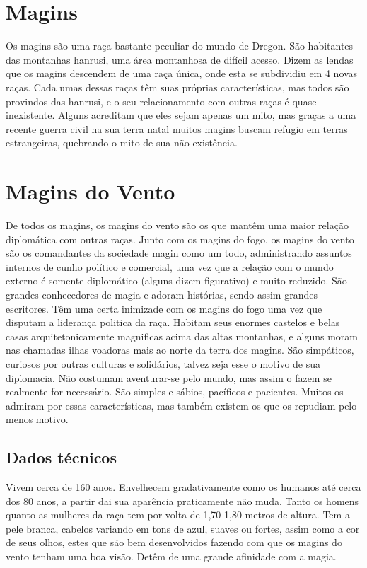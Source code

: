 \section{Magins}

Os magins são uma raça bastante peculiar do mundo de Dregon. São habitantes das montanhas hanrusi, uma área montanhosa de difícil acesso. Dizem as lendas que os magins descendem de uma raça única, onde esta se subdividiu em 4 novas raças. Cada umas dessas raças têm suas próprias características, mas todos são provindos das hanrusi, e o seu relacionamento com outras raças é quase inexistente. Alguns acreditam que eles sejam apenas um mito, mas graças a uma recente guerra civil na sua terra natal muitos magins buscam refugio em terras estrangeiras, quebrando o mito de sua não-existência.

\section{Magins do Vento}

De todos os magins, os magins do vento são os que mantêm uma maior relação diplomática com outras raças. Junto com os magins do fogo, os magins do vento são os comandantes da sociedade magin como um todo, administrando assuntos internos de cunho político e comercial, uma vez que a relação com o mundo externo é somente diplomático (alguns dizem figurativo) e muito reduzido. São grandes conhecedores de magia e adoram histórias, sendo assim grandes escritores. Têm uma certa inimizade com os magins do fogo uma vez que disputam a liderança politica da raça. Habitam seus enormes castelos e belas casas arquitetonicamente magnificas acima das altas montanhas, e alguns moram nas chamadas ilhas voadoras mais ao norte da terra dos magins. São simpáticos, curiosos por outras culturas e solidários, talvez seja esse o motivo de sua diplomacia. Não costumam aventurar-se pelo mundo, mas assim o fazem se realmente for necessário. São simples e sábios, pacíficos e pacientes. Muitos os admiram por essas características, mas também existem os que os repudiam pelo menos motivo.

\subsection{Dados técnicos}


Vivem cerca de 160 anos. Envelhecem gradativamente como os humanos até cerca dos 80 anos, a partir dai sua aparência praticamente não muda. Tanto os homens quanto as mulheres da raça tem por volta de 1,70-1,80 metros de altura. Tem a pele branca, cabelos variando em tons de azul, suaves ou fortes, assim como a cor de seus olhos, estes que são bem desenvolvidos fazendo com que os magins do vento tenham uma boa visão. Detêm de uma grande afinidade com a magia.


